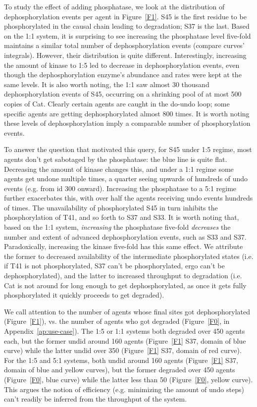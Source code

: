 To study the effect of adding phosphatase, we look at the distribution
of dephosphorylation events per agent in Figure~\ref{F1}.  S45 is the
first residue to be phosphorylated in the causal chain leading to
degradation; S37 is the last. Based on the 1:1 system, it is surprising
to see increasing the phosphatase level five-fold maintains a similar
total number of dephosphorylation events (compare curves' integrals).
However, their distribution is quite different.  Interestingly,
increasing the amount of kinase to 1:5 led to decrease in
dephosphorylation events, even though the dephosphorylation enzyme's
abundance and rates were kept at the same levels.  It is also worth
noting, the 1:1 saw almost 30 thousand dephosphorylation events of
S45, occurring on a shrinking pool of at most 500 copies of Cat.
Clearly certain agents are caught in the do-undo loop; some specific
agents are getting dephosphorylated almost 800 times. It is worth
noting these levels of dephosphorylation imply a comparable number of
phosphorylation events.

To answer the question that motivated this query, for S45 under 1:5 regime,
most agents don't get sabotaged by the phosphatase: the blue line is
quite flat. Decreasing the amount of kinase changes this, and
under a 1:1 regime some agents get undone multiple times, a quarter
seeing upwards of hundreds of undo events (e.g. from id 300
onward). Increasing the phosphatase to a 5:1 regime further
exacerbates this, with over half the agents receiving undo events
hundreds of times. The unavailability of phosphorylated S45 in turn
inhibits the phosphorylation of T41, and so forth to S37 and S33. It
is worth noting that, based on the 1:1 system, \emph{increasing} the
phosphatase five-fold \emph{decreases} the number and extent of advanced
dephosphorylation events, such as S33 and S37. Paradoxically,
increasing the kinase five-fold has this same effect. We attribute the
former to decreased availability of the intermediate phosphorylated
states (i.e. if T41 is not phosphorylated, S37 can't be
phosphorylated, ergo can't be dephosphorylated), and the latter to
increased throughput to degradation (i.e. Cat is not around for long
enough to get dephosphorylated, as once it gets fully phosphorylated it
quickly proceeds to get degraded).

We call attention to the number of agents whose final sites got
dephosphorylated (Figure~\ref{F1}), vs. the number of agents who got
degraded (Figure~\ref{F0}, in Appendix~\ref{ap:use-case}). The 1:5 or
1:1 systems both degraded over 450 agents each, but the former undid
around 160 agents (Figure~\ref{F1} S37, domain of blue curve) while
the latter undid over 350 (Figure~\ref{F1} S37, domain of red
curve). For the 1:5 and 5:1 systems, both undid around 160 agents
(Figure~\ref{F1} S37, domain of blue and yellow curves), but the
former degraded over 450 agents (Figure~\ref{F0}, blue curve) while
the latter less than 50 (Figure~\ref{F0}, yellow curve). This argues
the notion of efficiency (e.g. minimizing the amount of undo steps)
can't readily be inferred from the throughput of the system.


